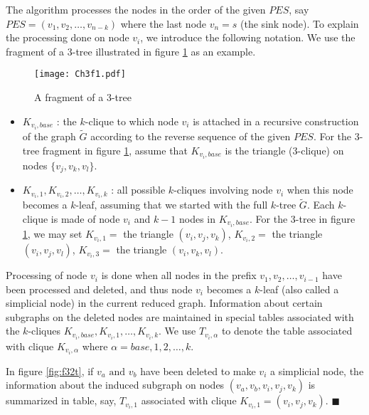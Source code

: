 The algorithm processes the nodes in the order of the given $PES$, say $PES=(v_1, v_2, \ldots, v_{n-k})$ where the last node $v_n=s$ (the sink node). To explain the processing done on node $v_i$, we introduce the following notation. We use the fragment of a $3$-tree illustrated in figure \ref{fig:f3t} as an example. 

\begin{figure}[!htb]
\tiny
\centering
\texttt{[image: Ch3f1.pdf]}
 \caption{ A fragment of a $3$-tree
 \label{fig:f3t}
}
\end{figure}


\begin{itemize}[noitemsep,nolistsep]
\item $K_{v_i,base}$ : the $k$-clique to which node $v_i$ is attached in a recursive construction of the graph $\tilde{G}$ according to the reverse sequence of the given $PES$. For the 3-tree fragment in figure \ref{fig:f3t}, assume that $K_{v_i,base}$ is the triangle (3-clique) on nodes $\{v_j, v_k, v_l\}$.
\item $K_{v_i,1}, K_{v_i,2}, \ldots, K_{v_i,k}$ : all possible $k$-cliques involving node $v_i$ when this node becomes a $k$-leaf, assuming that we started with the full $k$-tree $\tilde{G}$. Each $k$-clique is made of node $v_i$ and $k-1$ nodes in $K_{v_i,base}$. For the 3-tree in figure \ref{fig:f3t}, we may set $K_{v_i,1}=$ the triangle $(v_i,v_j,v_k)$, $K_{v_i,2}=$ the triangle $(v_i,v_j,v_l)$, $K_{v_i,3}=$ the triangle $(v_i,v_k,v_l)$.
\end{itemize}



Processing of node $v_i$ is done when all nodes in the prefix $v_1, v_2, \ldots, v_{i-1}$ have been processed and deleted, and thus node $v_i$ becomes a $k$-leaf (also called a simplicial node) in the current reduced graph. Information about certain subgraphs on the deleted nodes are maintained in special tables associated with the $k$-cliques $K_{v_i,base}, K_{v_i,1}, \ldots, K_{v_i, k}$. We use $T_{v_i,\alpha}$ to denote the table associated with clique $K_{v_i,\alpha}$ where $\alpha=base, 1, 2, \ldots, k$.

\begin{example}
\normalfont
In figure \ref{fig:f32t}, if $v_a \mbox{ and }v_b$ have been deleted to make $v_i$ a simplicial node, the information about the induced subgraph on nodes $(v_a, v_b, v_i, v_j, v_k)$ is summarized in table, say, $T_{v_i,1}$ associated with clique $K_{v_i,1}=(v_i,v_j,v_k)$. $\blacksquare$
\end{example}

